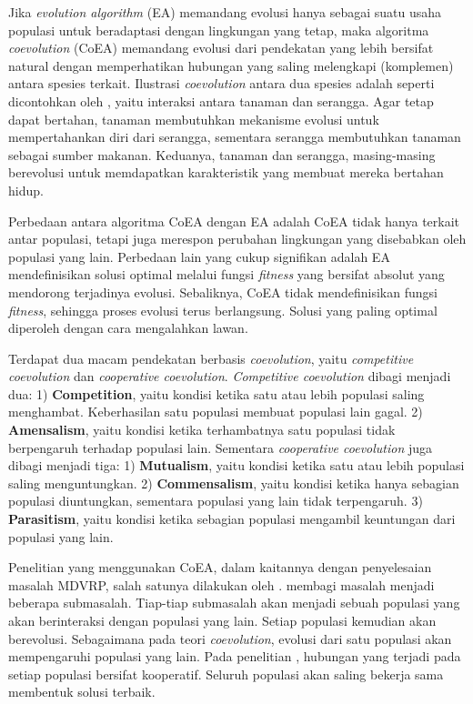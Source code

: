 Jika \textit{evolution algorithm} (EA) memandang evolusi hanya sebagai suatu usaha populasi untuk beradaptasi dengan lingkungan yang tetap, maka algoritma \textit{coevolution} (CoEA) memandang evolusi dari pendekatan yang lebih bersifat natural dengan memperhatikan hubungan yang saling melengkapi (komplemen) antara spesies terkait. Ilustrasi \textit{coevolution} antara dua spesies adalah seperti dicontohkan oleh \citep{holland_echo:_1990}, yaitu interaksi antara tanaman dan serangga. Agar tetap dapat bertahan, tanaman membutuhkan mekanisme evolusi untuk mempertahankan diri dari serangga, sementara serangga membutuhkan tanaman sebagai sumber makanan. Keduanya, tanaman dan serangga, masing-masing berevolusi untuk memdapatkan karakteristik yang membuat mereka bertahan hidup.


Perbedaan antara algoritma CoEA dengan EA adalah CoEA tidak hanya terkait antar populasi, tetapi juga merespon perubahan lingkungan yang disebabkan oleh populasi yang lain. Perbedaan lain yang cukup signifikan adalah EA mendefinisikan solusi optimal melalui fungsi \textit{fitness} yang bersifat absolut yang mendorong terjadinya evolusi. Sebaliknya, CoEA tidak mendefinisikan fungsi \textit{fitness}, sehingga proses evolusi terus berlangsung. Solusi yang paling optimal diperoleh dengan cara mengalahkan lawan.


Terdapat dua macam pendekatan berbasis \textit{coevolution}, yaitu \textit{competitive coevolution} dan \textit{cooperative coevolution}. \textit{Competitive coevolution} dibagi menjadi dua: 1) \textbf{Competition}, yaitu kondisi ketika satu atau lebih populasi saling menghambat. Keberhasilan satu populasi membuat populasi lain gagal. 2) \textbf{Amensalism}, yaitu kondisi ketika terhambatnya satu populasi tidak berpengaruh terhadap populasi lain. Sementara  \textit{cooperative coevolution} juga dibagi menjadi tiga: 1) \textbf{Mutualism}, yaitu kondisi ketika satu atau lebih populasi saling menguntungkan. 2) \textbf{Commensalism}, yaitu kondisi ketika hanya sebagian populasi diuntungkan, sementara populasi yang lain tidak terpengaruh. 3) \textbf{Parasitism}, yaitu kondisi ketika sebagian populasi mengambil keuntungan dari populasi yang lain.


Penelitian yang menggunakan CoEA, dalam kaitannya dengan penyelesaian masalah MDVRP, salah satunya dilakukan oleh \citep{de_oliveira_cooperative_2016}. \citep{de_oliveira_cooperative_2016} membagi masalah menjadi beberapa submasalah. Tiap-tiap submasalah akan menjadi sebuah populasi yang akan berinteraksi dengan populasi yang lain. Setiap populasi kemudian akan berevolusi. Sebagaimana pada teori \textit{coevolution}, evolusi dari satu populasi akan mempengaruhi populasi yang lain. Pada penelitian \citep{de_oliveira_cooperative_2016}, hubungan yang terjadi pada setiap populasi bersifat kooperatif. Seluruh populasi akan saling bekerja sama membentuk solusi terbaik.


